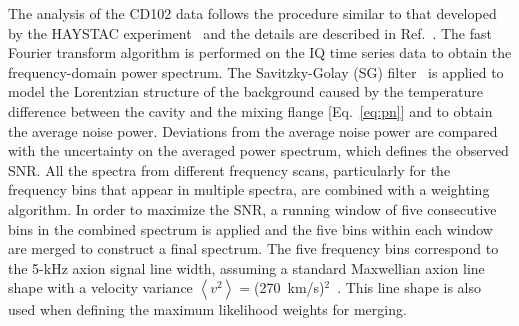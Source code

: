 \documentclass[%
 reprint,prl, %
superscriptaddress,
nobibnotes,
 amsmath,amssymb,
 aps,
]{revtex4-2}
\newcommand{\ma}{\ensuremath{m_a}}
\begin{document}
%




   The analysis of the CD102 data follows the procedure similar to that 
developed by the HAYSTAC experiment~\cite{HAYSTACII} and the details are 
described in Ref.~\cite{TASEHAnalysis}. The fast Fourier transform 
algorithm is performed on the IQ time series data to obtain the 
frequency-domain power spectrum. 
The Savitzky-Golay (SG) 
filter~\cite{SGFilter} is applied to model the Lorentzian structure of 
the background caused by the temperature difference between the cavity and 
the mixing flange [Eq.~\eqref{eq:pn}] and to obtain the 
average noise power. 
Deviations from the average noise power are compared with the 
uncertainty on the averaged power spectrum, which defines the 
observed SNR. All the spectra from different 
frequency scans, particularly for the frequency bins that appear in 
multiple spectra, are combined with a weighting algorithm. 
In order to maximize the SNR, a running window of 
five consecutive bins in the combined spectrum is applied and the five bins 
within each window are merged to construct a final spectrum. 
The five frequency bins correspond to the 5-kHz axion signal line width,  
assuming a standard Maxwellian axion line shape with a velocity 
variance $\left<v^2\right>=$(270~km/s)$^2$~\cite{HAYSTACII}. 
This line shape is also used when defining the maximum likelihood 
weights for merging. 
\end{document}

